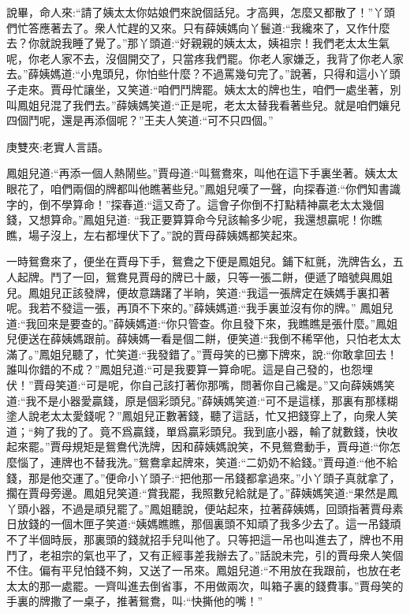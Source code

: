 \begin{parag}
    說畢，命人來:“請了姨太太你姑娘們來說個話兒。才高興，怎麼又都散了！”丫頭們忙答應著去了。衆人忙趕的又來。只有薛姨媽向丫鬟道:“我纔來了，又作什麼去？你就說我睡了覺了。”那丫頭道:“好親親的姨太太，姨祖宗！我們老太太生氣呢，你老人家不去，沒個開交了，只當疼我們罷。你老人家嫌乏，我背了你老人家去。”薛姨媽道:“小鬼頭兒，你怕些什麼？不過罵幾句完了。”說著，只得和這小丫頭子走來。賈母忙讓坐，又笑道:“咱們鬥牌罷。姨太太的牌也生，咱們一處坐著，別叫鳳姐兒混了我們去。”薛姨媽笑道:“正是呢，老太太替我看著些兒。就是咱們孃兒四個鬥呢，還是再添個呢？”王夫人笑道:“可不只四個。”\begin{note}庚雙夾:老實人言語。\end{note}鳳姐兒道:“再添一個人熱鬧些。”賈母道:“叫鴛鴦來，叫他在這下手裏坐著。姨太太眼花了，咱們兩個的牌都叫他瞧著些兒。”鳳姐兒嘆了一聲，向探春道:“你們知書識字的，倒不學算命！”探春道:“這又奇了。這會子你倒不打點精神贏老太太幾個錢，又想算命。”鳳姐兒道: “我正要算算命今兒該輸多少呢，我還想贏呢！你瞧瞧，場子沒上，左右都埋伏下了。”說的賈母薛姨媽都笑起來。
\end{parag}


\begin{parag}
    一時鴛鴦來了，便坐在賈母下手，鴛鴦之下便是鳳姐兒。鋪下紅氈，洗牌告幺，五人起牌。鬥了一回，鴛鴦見賈母的牌已十嚴，只等一張二餅，便遞了暗號與鳳姐兒。鳳姐兒正該發牌，便故意躊躇了半晌，笑道:“我這一張牌定在姨媽手裏扣著呢。我若不發這一張，再頂不下來的。”薛姨媽道:“我手裏並沒有你的牌。” 鳳姐兒道:“我回來是要查的。”薛姨媽道:“你只管查。你且發下來，我瞧瞧是張什麼。”鳳姐兒便送在薛姨媽跟前。薛姨媽一看是個二餅，便笑道:“我倒不稀罕他，只怕老太太滿了。”鳳姐兒聽了，忙笑道:“我發錯了。”賈母笑的已擲下牌來，說:“你敢拿回去！誰叫你錯的不成？”鳳姐兒道:“可是我要算一算命呢。這是自己發的，也怨埋伏！”賈母笑道:“可是呢，你自己該打著你那嘴，問著你自己纔是。”又向薛姨媽笑道:“我不是小器愛贏錢，原是個彩頭兒。”薛姨媽笑道:“可不是這樣，那裏有那樣糊塗人說老太太愛錢呢？”鳳姐兒正數著錢，聽了這話，忙又把錢穿上了，向衆人笑道；“夠了我的了。竟不爲贏錢，單爲贏彩頭兒。我到底小器，輸了就數錢，快收起來罷。”賈母規矩是鴛鴦代洗牌，因和薛姨媽說笑，不見鴛鴦動手，賈母道:“你怎麼惱了，連牌也不替我洗。”鴛鴦拿起牌來，笑道:“二奶奶不給錢。”賈母道:“他不給錢，那是他交運了。”便命小丫頭子:“把他那一吊錢都拿過來。”小丫頭子真就拿了，擱在賈母旁邊。鳳姐兒笑道:“賞我罷，我照數兒給就是了。”薛姨媽笑道:“果然是鳳丫頭小器，不過是頑兒罷了。”鳳姐聽說，便站起來，拉著薛姨媽，回頭指著賈母素日放錢的一個木匣子笑道:“姨媽瞧瞧，那個裏頭不知頑了我多少去了。這一吊錢頑不了半個時辰，那裏頭的錢就招手兒叫他了。只等把這一吊也叫進去了，牌也不用鬥了，老祖宗的氣也平了，又有正經事差我辦去了。”話說未完，引的賈母衆人笑個不住。偏有平兒怕錢不夠，又送了一吊來。鳳姐兒道:“不用放在我跟前，也放在老太太的那一處罷。一齊叫進去倒省事，不用做兩次，叫箱子裏的錢費事。”賈母笑的手裏的牌撒了一桌子，推著鴛鴦，叫:“快撕他的嘴！”
\end{parag}


